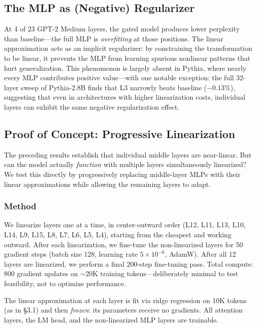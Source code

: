 \documentclass[11pt]{article}
\begin{document}
\subsection{The MLP as (Negative) Regularizer}

At 4 of 23 GPT-2 Medium layers, the gated model produces lower perplexity than baseline---the full MLP is \textit{overfitting} at those positions. The linear approximation acts as an implicit regularizer: by constraining the transformation to be linear, it prevents the MLP from learning spurious nonlinear patterns that hurt generalization. This phenomenon is largely absent in Pythia, where nearly every MLP contributes positive value---with one notable exception: the full 32-layer sweep of Pythia-2.8B finds that L3 narrowly beats baseline ($-0.13\%$), suggesting that even in architectures with higher linearization costs, individual layers can exhibit the same negative regularization effect.

\subsection{Proof of Concept: Progressive Linearization}
\label{sec:poc}

The preceding results establish that individual middle layers are near-linear. But can the model actually \textit{function} with multiple layers simultaneously linearized? We test this directly by progressively replacing middle-layer MLPs with their linear approximations while allowing the remaining layers to adapt.

\subsubsection{Method}

We linearize layers one at a time, in center-outward order (L12, L11, L13, L10, L14, L9, L15, L8, L7, L6, L5, L4), starting from the cheapest and working outward. After each linearization, we fine-tune the non-linearized layers for 50 gradient steps (batch size 128, learning rate $5 \times 10^{-6}$, AdamW). After all 12 layers are linearized, we perform a final 200-step fine-tuning pass. Total compute: 800 gradient updates on ${\sim}$20K training tokens---deliberately minimal to test feasibility, not to optimize performance.

The linear approximation at each layer is fit via ridge regression on 10K tokens (as in \S3.1) and then \textit{frozen}: its parameters receive no gradients. All attention layers, the LM head, and the non-linearized MLP layers are trainable.
\end{document}
